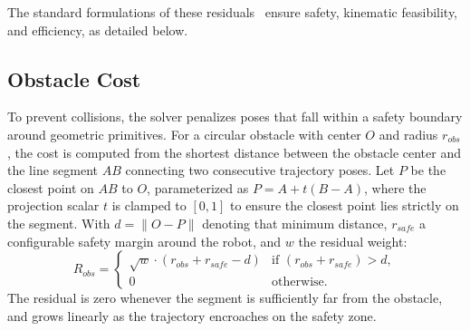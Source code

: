 The standard formulations of these residuals~\cite{rosmann2012teb} ensure safety, kinematic feasibility, and efficiency, as detailed below.

\subsection{Obstacle Cost}
\label{subsec:obstacle-cost}
To prevent collisions, the solver penalizes poses that fall within a safety boundary around geometric primitives. For a circular obstacle with center $O$ and radius $r_{obs}$, the cost is computed from the shortest distance between the obstacle center and the line segment $AB$ connecting two consecutive trajectory poses. Let $P$ be the closest point on $AB$ to $O$, parameterized as $P = A + t(B - A)$, where the projection scalar $t$ is clamped to $[0, 1]$ to ensure the closest point lies strictly on the segment. With $d = \|O - P\|$ denoting that minimum distance, $r_{safe}$ a configurable safety margin around the robot, and $w$ the residual weight:
\begin{equation}
    R_{obs} = \begin{cases} 
    \sqrt{w} \cdot (r_{obs} + r_{safe} - d) & \text{if } (r_{obs} + r_{safe}) > d, \\ 
    0 & \text{otherwise}.
    \end{cases}
\end{equation}
The residual is zero whenever the segment is sufficiently far from the obstacle, and grows linearly as the trajectory encroaches on the safety zone.

